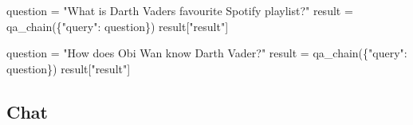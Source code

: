 \documentclass[
  letterpaper,
  DIV=11,
  numbers=noendperiod]{scrreprt}
\newenvironment{Shaded}{\begin{snugshade}}{\end{snugshade}}
\newcommand{\NormalTok}[1]{\textcolor[rgb]{0.00,0.23,0.31}{#1}}
\newcommand{\OperatorTok}[1]{\textcolor[rgb]{0.37,0.37,0.37}{#1}}
\newcommand{\StringTok}[1]{\textcolor[rgb]{0.13,0.47,0.30}{#1}}
\begin{document}
\begin{Shaded}
\begin{Highlighting}[]
\NormalTok{question }\OperatorTok{=} \StringTok{"What is Darth Vader\textquotesingle{}s favourite Spotify playlist?"}
\NormalTok{result }\OperatorTok{=}\NormalTok{ qa\_chain(\{}\StringTok{"query"}\NormalTok{: question\})}
\NormalTok{result[}\StringTok{"result"}\NormalTok{]}
\end{Highlighting}
\end{Shaded}

\begin{Shaded}
\begin{Highlighting}[]
\NormalTok{question }\OperatorTok{=} \StringTok{"How does Obi Wan know Darth Vader?"}
\NormalTok{result }\OperatorTok{=}\NormalTok{ qa\_chain(\{}\StringTok{"query"}\NormalTok{: question\})}
\NormalTok{result[}\StringTok{"result"}\NormalTok{]}
\end{Highlighting}
\end{Shaded}

\hypertarget{chat}{%
\subsection{Chat}\label{chat}}
\end{document}

